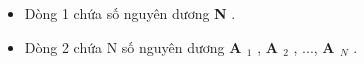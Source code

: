 \begin{itemize}
	\item Dòng 1 chứa số nguyên dương \textbf{ N } .
	\item Dòng 2 chứa N số nguyên dương \textbf{ A $_ 1 $} , \textbf{ A $_ 2 $} , ..., \textbf{ A $_ N $} .
\end{itemize}
